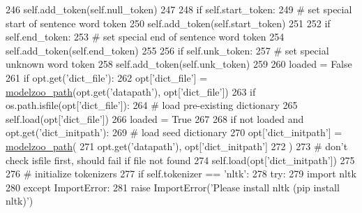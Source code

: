 \begin{DoxyCode}
246                 self.add\_token(self.null\_token)
247 
248             \textcolor{keywordflow}{if} self.start\_token:
249                 \textcolor{comment}{# set special start of sentence word token}
250                 self.add\_token(self.start\_token)
251 
252             \textcolor{keywordflow}{if} self.end\_token:
253                 \textcolor{comment}{# set special end of sentence word token}
254                 self.add\_token(self.end\_token)
255 
256             \textcolor{keywordflow}{if} self.unk\_token:
257                 \textcolor{comment}{# set special unknown word token}
258                 self.add\_token(self.unk\_token)
259 
260             loaded = \textcolor{keyword}{False}
261             \textcolor{keywordflow}{if} opt.get(\textcolor{stringliteral}{'dict\_file'}):
262                 opt[\textcolor{stringliteral}{'dict\_file'}] = \hyperlink{namespaceparlai_1_1agents_1_1legacy__agents_1_1seq2seq_1_1utils__v0_a5fbd3301b67f00d6d146fb01c7cd7626}{modelzoo\_path}(opt.get(\textcolor{stringliteral}{'datapath'}), opt[\textcolor{stringliteral}{'dict\_file'}])
263                 \textcolor{keywordflow}{if} os.path.isfile(opt[\textcolor{stringliteral}{'dict\_file'}]):
264                     \textcolor{comment}{# load pre-existing dictionary}
265                     self.load(opt[\textcolor{stringliteral}{'dict\_file'}])
266                     loaded = \textcolor{keyword}{True}
267 
268             \textcolor{keywordflow}{if} \textcolor{keywordflow}{not} loaded \textcolor{keywordflow}{and} opt.get(\textcolor{stringliteral}{'dict\_initpath'}):
269                 \textcolor{comment}{# load seed dictionary}
270                 opt[\textcolor{stringliteral}{'dict\_initpath'}] = \hyperlink{namespaceparlai_1_1agents_1_1legacy__agents_1_1seq2seq_1_1utils__v0_a5fbd3301b67f00d6d146fb01c7cd7626}{modelzoo\_path}(
271                     opt.get(\textcolor{stringliteral}{'datapath'}), opt[\textcolor{stringliteral}{'dict\_initpath'}]
272                 )
273                 \textcolor{comment}{# don't check isfile first, should fail if file not found}
274                 self.load(opt[\textcolor{stringliteral}{'dict\_initpath'}])
275 
276         \textcolor{comment}{# initialize tokenizers}
277         \textcolor{keywordflow}{if} self.tokenizer == \textcolor{stringliteral}{'nltk'}:
278             \textcolor{keywordflow}{try}:
279                 \textcolor{keyword}{import} nltk
280             \textcolor{keywordflow}{except} ImportError:
281                 \textcolor{keywordflow}{raise} ImportError(\textcolor{stringliteral}{'Please install nltk (pip install nltk)'})

\end{DoxyCode}
